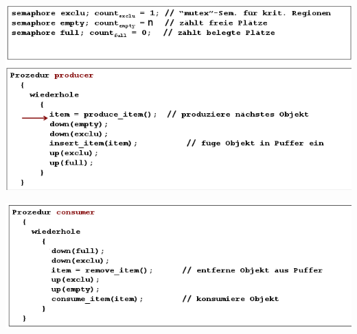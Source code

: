 \documentclass[11pt,a4paper]{article}
\begin{document}
\begin{itemize}
\includegraphics[scale=0.7]{produzent.png}

\includegraphics[scale=0.7]{konsument.png}

\end{itemize}


\pagebreak
\end{document}
